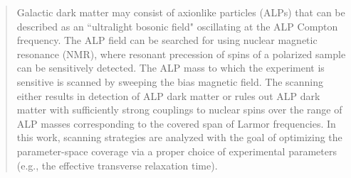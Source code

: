 \documentclass{WileyMSP-template}
\begin{document}
	


	
	
	\begin{abstract}
		Galactic dark matter may consist of axionlike particles (ALPs) that can be described as an ``ultralight bosonic field" oscillating at the ALP Compton frequency. The ALP field can be searched for using nuclear magnetic resonance (NMR), where resonant precession of spins of a polarized sample can be sensitively detected.
		The ALP mass to which the experiment is sensitive is scanned by sweeping the bias magnetic field.
		The scanning either results in detection of ALP dark matter or 
		rules out ALP dark matter with sufficiently strong couplings to nuclear spins over the range of ALP masses corresponding to the covered span of Larmor frequencies. In this work, scanning strategies are analyzed with the goal of optimizing the parameter-space coverage via a proper choice of experimental parameters (e.g., the effective transverse relaxation time).


	\end{abstract}

\end{document}

